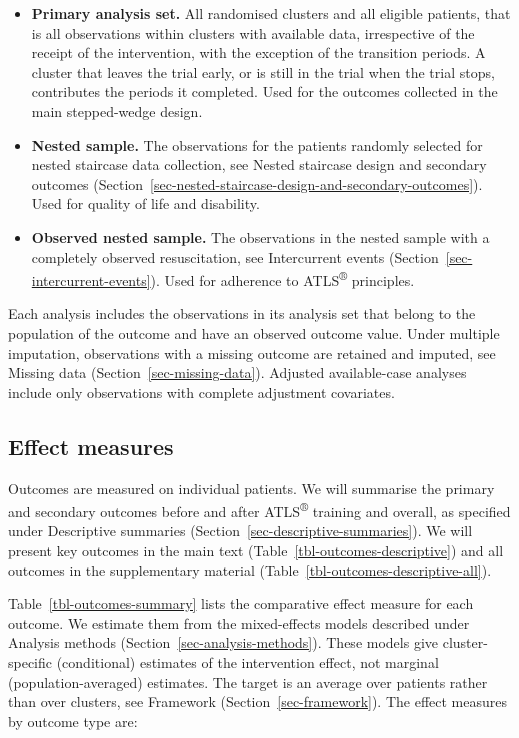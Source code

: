 \documentclass[
]{scrartcl}
\providecommand{\tightlist}{%
  \setlength{\itemsep}{0pt}\setlength{\parskip}{0pt}}\usepackage{longtable,booktabs,array}
\begin{document}
\begin{itemize}
\tightlist
\item
  \textbf{Primary analysis set.} All randomised clusters and all
  eligible patients, that is all observations within clusters with
  available data, irrespective of the receipt of the intervention, with
  the exception of the transition periods. A cluster that leaves the
  trial early, or is still in the trial when the trial stops,
  contributes the periods it completed. Used for the outcomes collected
  in the main stepped-wedge design.
\item
  \textbf{Nested sample.} The observations for the patients randomly
  selected for nested staircase data collection, see
  Nested staircase design and secondary outcomes
  (Section~\ref{sec-nested-staircase-design-and-secondary-outcomes}).
  Used for quality of life and disability.
\item
  \textbf{Observed nested sample.} The observations in the nested sample
  with a completely observed resuscitation, see Intercurrent events
  (Section~\ref{sec-intercurrent-events}). Used for adherence to
  ATLS\textsuperscript{®} principles.
\end{itemize}

Each analysis includes the observations in its analysis set that belong
to the population of the outcome and have an observed outcome value.
Under multiple imputation, observations with a missing outcome are
retained and imputed, see Missing data (Section~\ref{sec-missing-data}).
Adjusted available-case analyses include only observations with complete
adjustment covariates.

\subsection{Effect measures}\label{sec-effect-measures}

Outcomes are measured on individual patients. We will summarise the
primary and secondary outcomes before and after ATLS\textsuperscript{®}
training and overall, as specified under Descriptive summaries
(Section~\ref{sec-descriptive-summaries}). We will present key outcomes
in the main text (Table~\ref{tbl-outcomes-descriptive}) and all outcomes
in the supplementary material
(Table~\ref{tbl-outcomes-descriptive-all}).

Table~\ref{tbl-outcomes-summary} lists the comparative effect measure
for each outcome. We estimate them from the mixed-effects models
described under Analysis methods (Section~\ref{sec-analysis-methods}).
These models give cluster-specific (conditional) estimates of the
intervention effect, not marginal (population-averaged) estimates. The
target is an average over patients rather than over clusters, see
Framework (Section~\ref{sec-framework}). The effect measures by outcome
type are:
\end{document}
